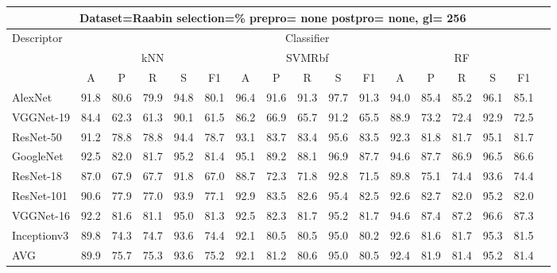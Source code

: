 \documentclass[12pt,italian]{article}
\begin{document}
\begin{tiny}
\begin{longtable}{lcccccccccccccccc}
\toprule
\multicolumn{16}{c}{Dataset=Raabin selection=\% prepro= none postpro= none, gl= 256} \\ 
\toprule
Descriptor & \multicolumn{15}{c}{Classifier} \\ 
& \multicolumn{5}{c}{kNN} & \multicolumn{5}{c}{SVMRbf} & \multicolumn{5}{c}{RF} \\ 
& A & P & R & S & F1 & A & P & R & S & F1 & A & P & R & S & F1 \\ 
\midrule
AlexNet & 91.8 & 80.6 & 79.9 & 94.8 & 80.1 & 96.4 & 91.6 & 91.3 & 97.7 & 91.3 & 94.0 & 85.4 & 85.2 & 96.1 & 85.1 \\ 
VGGNet-19 & 84.4 & 62.3 & 61.3 & 90.1 & 61.5 & 86.2 & 66.9 & 65.7 & 91.2 & 65.5 & 88.9 & 73.2 & 72.4 & 92.9 & 72.5 \\ 
ResNet-50 & 91.2 & 78.8 & 78.8 & 94.4 & 78.7 & 93.1 & 83.7 & 83.4 & 95.6 & 83.5 & 92.3 & 81.8 & 81.7 & 95.1 & 81.7 \\ 
GoogleNet & 92.5 & 82.0 & 81.7 & 95.2 & 81.4 & 95.1 & 89.2 & 88.1 & 96.9 & 87.7 & 94.6 & 87.7 & 86.9 & 96.5 & 86.6 \\ 
ResNet-18 & 87.0 & 67.9 & 67.7 & 91.8 & 67.0 & 88.7 & 72.3 & 71.8 & 92.8 & 71.5 & 89.8 & 75.1 & 74.4 & 93.6 & 74.4 \\ 
ResNet-101 & 90.6 & 77.9 & 77.0 & 93.9 & 77.1 & 92.9 & 83.5 & 82.6 & 95.4 & 82.5 & 92.6 & 82.7 & 82.0 & 95.2 & 82.0 \\ 
VGGNet-16 & 92.2 & 81.6 & 81.1 & 95.0 & 81.3 & 92.5 & 82.3 & 81.7 & 95.2 & 81.7 & 94.6 & 87.4 & 87.2 & 96.6 & 87.3 \\ 
Inceptionv3 & 89.8 & 74.3 & 74.7 & 93.6 & 74.4 & 92.1 & 80.5 & 80.5 & 95.0 & 80.2 & 92.6 & 81.6 & 81.7 & 95.3 & 81.5 \\ 
\hline
AVG & 89.9 & 75.7 & 75.3 & 93.6 & 75.2 & 92.1 & 81.2 & 80.6 & 95.0 & 80.5 & 92.4 & 81.9 & 81.4 & 95.2 & 81.4 \\ 
\hline
\bottomrule
\end{longtable} 

 \pagebreak 
\end{tiny} 
 
\end{document}
